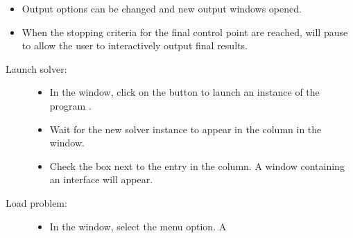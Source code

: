 \begin{list}{}{\setlength{\labelwidth}{0pt}
               \setlength{\leftmargin}{0pt}
               \setlength{\rightmargin}{\leftmargin}
               \setlength{\itemsep}{0pt}}
\begin{description}
\begin{itemize}
\begin{itemize}
        \item {\bf LoadProblem:} Restart with a new problem.
        \item {\bf Run:}    Apply a sequence of fields until all complete.
        \item {\bf Relax:}  Run the ODE at the current applied field until
            the next control point is reached.
        \item {\bf Pause:}  Click anytime to stop the solver.  Continue
            simulation from paused point with  or .
        \item {\bf\boldmath Field$-$:} Apply the previous field again.
        \item {\bf\boldmath Field$+$:} Apply the next field in the list.
      \end{itemize}
      \item Output options can be changed and new output windows opened.
      \item When the stopping criteria for the final control point are
            reached,  will pause to allow the user to
            interactively output final results.
    \end{itemize}
  \end{description}
  \item {}
  \begin{description}
    \item[Launch solver:]\blankspace
    \begin{itemize}
      \item In the  window, click on the 
            button to launch an instance of the program
            .
      \item Wait for the new solver instance to appear in the 
           column in the  window.
      \item Check the box next to the  entry in the
          column.  A window containing an  interface will
          appear.
    \end{itemize}
    \item[Load problem:]\blankspace
    \begin{itemize}
      \item In the  window, select the
         menu option.  A 

\end{itemize}
\end{description}
\end{list}
